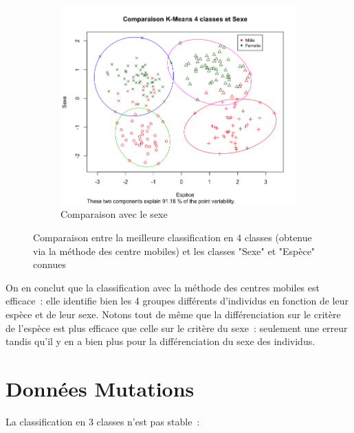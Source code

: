 \documentclass[a4paper,10pt]{report}
\begin{document}
\begin{figure}[H]
\begin{subfigure}[b]{0.5\linewidth}
		\includegraphics[width=1\linewidth]{img/3-2-2-crabs-kmeans-4-classes-sexe}
		\caption{\small Comparaison avec le sexe}
		\label{fig:3-2-2-crabs-kmeans-4-classes-sexe}
	\end{subfigure}%
	\caption{\small Comparaison entre la meilleure classification en 4 classes (obtenue via la méthode des centre mobiles) et les classes "Sexe" et "Espèce" connues}
	\label{fig:3-2-1-Crabs-kmeans-4-classes}
\end{figure}


On en conclut que la classification avec la méthode des centres mobiles est efficace~: elle identifie bien les 4 groupes différents d'individus en fonction de leur espèce et de leur sexe. Notons tout de même que la différenciation sur le critère de l'espèce est plus efficace que celle sur le critère du sexe~: seulement une erreur tandis qu'il y en a bien plus pour la différenciation du sexe des individus.




\section{Données Mutations}





La classification en 3 classes n'est pas stable~:
\end{document}
